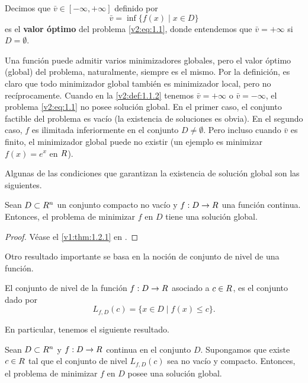 \begin{definition}\label{v2:def:1.1.2}
    Decimos que $\bar{v} \in [-\infty, +\infty]$ definido por
    \[
        \bar{v} = \inf \{ f(x) \mid x \in D \}
    \]
    es el \textbf{valor óptimo} del problema \eqref{v2:eq:1.1}, donde entendemos que $\bar{v} = +\infty$ si $D = \emptyset$.
\end{definition}

Una función puede admitir varios minimizadores globales, pero el valor óptimo (global) del problema, naturalmente, siempre es el mismo. Por la definición, es claro que todo minimizador global también es minimizador local, pero no recíprocamente.
Cuando en la \cref{v2:def:1.1.2} tenemos $\bar{v} = +\infty$ o $\bar{v} = -\infty$, el problema \eqref{v2:eq:1.1} no posee solución global. En el primer caso, el conjunto factible del problema es vacío (la existencia de soluciones es obvia). En el segundo caso, $f$ es ilimitada inferiormente en el conjunto $D \neq \emptyset$. Pero incluso cuando $\bar{v}$ es finito, el minimizador global puede no existir (un ejemplo es minimizar $f(x) = e^x$ en $R$).

Algunas de las condiciones que garantizan la existencia de solución global son las siguientes.

\begin{theorem}\label{v2:thm:1.1.1}
    Sean $D \subset R^n$ un conjunto compacto no vacío y $f : D \to R$ una función continua. Entonces, el problema de minimizar $f$ en $D$ tiene una solución global.
\end{theorem}

\begin{proof}
    Véase el \cref{v1:thm:1.2.1} en \cite{izmailov2020otimizacaovolume1}.
\end{proof}

Otro resultado importante se basa en la noción de conjunto de nivel de una función.

\begin{definition}\label{v2:def:1.1.3}
    El conjunto de nivel de la función $f : D \to R$ asociado a $c \in R$, es el conjunto dado por
    \[
        L_{f,D}(c) = \{ x \in D \mid f(x) \le c \}.
    \]
\end{definition}

En particular, tenemos el siguiente resultado.

\begin{corollary}\label{v2:cor:1.1.1}
    Sean $D \subset R^n$ y $f : D \to R$ continua en el conjunto $D$. Supongamos que existe $c \in R$ tal que el conjunto de nivel $L_{f,D}(c)$ sea no vacío y compacto.
    Entonces, el problema de minimizar $f$ en $D$ posee una solución global.
\end{corollary}

